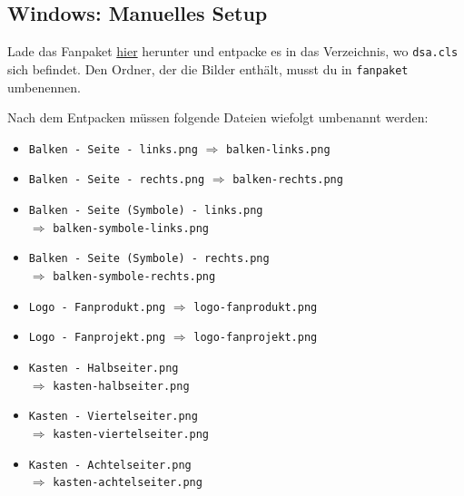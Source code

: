 \documentclass{dsa}
\begin{document}
   \vspace{12pt}
   
   \begin{dsaBoxPortrait}
      \subsection*{Windows: Manuelles Setup}
      Lade das Fanpaket
      \href{http://www.ulisses-spiele.de/download/889/}{hier} herunter und
      entpacke es in das Verzeichnis, wo \texttt{dsa.cls} sich befindet. Den
      Ordner, der die Bilder enthält, musst du in \texttt{fanpaket} umbenennen.
      
      Nach dem Entpacken müssen folgende Dateien wiefolgt umbenannt werden:
      
      \scriptsize
      \begin{itemize} \itemsep0em
         \item \texttt{Balken - Seite - links.png} $\Rightarrow$ \texttt{balken-links.png}
         \item \texttt{Balken - Seite - rechts.png} $\Rightarrow$ \texttt{balken-rechts.png}
         \item \texttt{Balken - Seite (Symbole) - links.png} \\ $\Rightarrow$ \texttt{balken-symbole-links.png}
         \item \texttt{Balken - Seite (Symbole) - rechts.png} \\ $\Rightarrow$ \texttt{balken-symbole-rechts.png}
         \item \texttt{Logo - Fanprodukt.png} $\Rightarrow$ \texttt{logo-fanprodukt.png}
         \item \texttt{Logo - Fanprojekt.png} $\Rightarrow$ \texttt{logo-fanprojekt.png}
         \item \texttt{Kasten - Halbseiter.png} \\ $\Rightarrow$ \texttt{kasten-halbseiter.png}
         \item \texttt{Kasten - Viertelseiter.png} \\ $\Rightarrow$ \texttt{kasten-viertelseiter.png}
         \item \texttt{Kasten - Achtelseiter.png} \\ $\Rightarrow$ \texttt{kasten-achtelseiter.png}
      \end{itemize}
   \end{dsaBoxPortrait}
   
\end{document}
